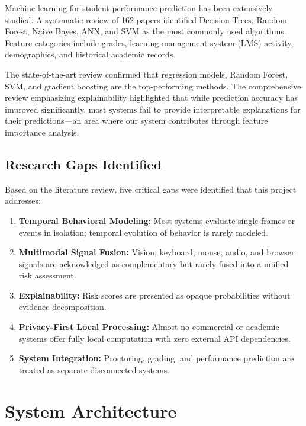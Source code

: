 \documentclass{article}
\begin{document}
Machine learning for student performance prediction has been extensively studied. A systematic review of 162 papers \cite{ml_student_performance_2023} identified Decision Trees, Random Forest, Naive Bayes, ANN, and SVM as the most commonly used algorithms. Feature categories include grades, learning management system (LMS) activity, demographics, and historical academic records.

The state-of-the-art review \cite{predicting_student_success_2024} confirmed that regression models, Random Forest, SVM, and gradient boosting are the top-performing methods. The comprehensive review emphasizing explainability \cite{explainable_prediction_2024} highlighted that while prediction accuracy has improved significantly, most systems fail to provide interpretable explanations for their predictions---an area where our system contributes through feature importance analysis.

\subsection{Research Gaps Identified}

Based on the literature review, five critical gaps were identified that this project addresses:

\begin{enumerate}
    \item \textbf{Temporal Behavioral Modeling:} Most systems evaluate single frames or events in isolation; temporal evolution of behavior is rarely modeled.
    \item \textbf{Multimodal Signal Fusion:} Vision, keyboard, mouse, audio, and browser signals are acknowledged as complementary but rarely fused into a unified risk assessment.
    \item \textbf{Explainability:} Risk scores are presented as opaque probabilities without evidence decomposition.
    \item \textbf{Privacy-First Local Processing:} Almost no commercial or academic systems offer fully local computation with zero external API dependencies.
    \item \textbf{System Integration:} Proctoring, grading, and performance prediction are treated as separate disconnected systems.
\end{enumerate}

\section{System Architecture}
\label{sec:system_architecture}
\end{document}
